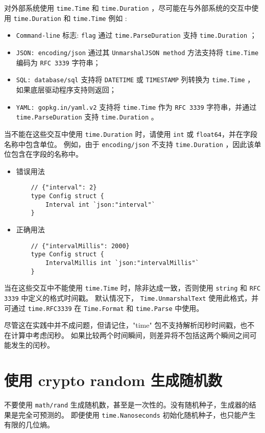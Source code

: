对外部系统使用 \texttt{time.Time} 和 \texttt{time.Duration} ，尽可能在与外部系统的交互中使用 \texttt{time.Duration} 和 \texttt{time.Time} 例如 :
\begin{itemize}
\item \texttt{Command-line} 标志: \texttt{flag} 通过 \texttt{time.ParseDuration} 支持 \texttt{time.Duration} ；
\item \texttt{JSON: encoding/json} 通过其 \texttt{UnmarshalJSON method} 方法支持将 \texttt{time.Time} 编码为 \texttt{RFC 3339} 字符串；
\item \texttt{SQL: database/sql} 支持将 \texttt{DATETIME} 或 \texttt{TIMESTAMP} 列转换为 \texttt{time.Time} ，如果底层驱动程序支持则返回；
\item \texttt{YAML: gopkg.in/yaml.v2} 支持将 \texttt{time.Time} 作为 \texttt{RFC 3339} 字符串，并通过 \texttt{time.ParseDuration} 支持 \texttt{time.Duration} 。
\end{itemize}

当不能在这些交互中使用 \texttt{time.Duration} 时，请使用 \texttt{int} 或 \texttt{float64}，并在字段名称中包含单位。
例如，由于 \texttt{encoding/json} 不支持 \texttt{time.Duration} ，因此该单位包含在字段的名称中。

\begin{itemize}[leftmargin=4em]
\item 错误用法

  \begin{verbatim}
    // {"interval": 2}
    type Config struct {
    	Interval int `json:"interval"`
    }
  \end{verbatim}
\item 正确用法

  \begin{verbatim}
    // {"intervalMillis": 2000}
    type Config struct {
    	IntervalMillis int `json:"intervalMillis"`
    }
  \end{verbatim}
\end{itemize}

当在这些交互中不能使用 \texttt{time.Time} 时，除非达成一致，否则使用 \texttt{string} 和 \texttt{RFC 3339} 中定义的格式时间戳。
默认情况下， \texttt{Time.UnmarshalText} 使用此格式，并可通过 \texttt{time.RFC3339} 在 \texttt{Time.Format} 和 \texttt{time.Parse} 中使用。

尽管这在实践中并不成问题，但请记住，"time" 包不支持解析闰秒时间戳，也不在计算中考虑闰秒。
如果比较两个时间瞬间，则差异将不包括这两个瞬间之间可能发生的闰秒。

\section{使用 crypto random 生成随机数}
不要使用 \texttt{math/rand} 生成随机数，甚至是一次性的。没有随机种子，生成器的结果是完全可预测的。
即便使用 \texttt{time.Nanoseconds} 初始化随机种子，也只能产生有限的几位熵。

